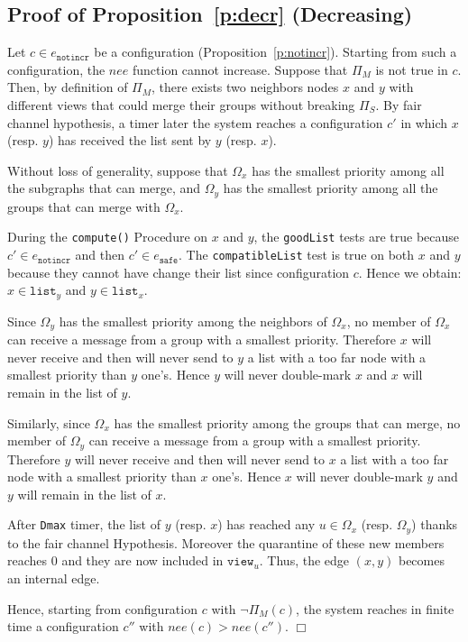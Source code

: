 \documentclass[11pt,english]{article}
\newenvironment{proof}[1][0cm]{
  \begin{list}{\bf Proof.~}{
      \setlength{\itemindent}{0cm}
      \setlength{\labelsep}{0cm}
      \setlength{\labelwidth}{#1}
      \setlength{\leftmargin}{#1}
    \item
    }
}{\hfill$\Box$
  \end{list}
}
\begin{document}
\subsection{Proof of Proposition~\ref{p:decr} (Decreasing)}

\begin{proof}
  Let $c \in e_\texttt{notincr}$ be a configuration
  (Proposition~\ref{p:notincr}). Starting from such a configuration, the $nee$
  function cannot increase.
Suppose that $\Pi_M$ is not true in $c$. Then, by definition of $\Pi_M$, there
  exists two neighbors nodes $x$ and $y$ with different views that could merge
  their groups without breaking $\Pi_S$. By fair channel hypothesis, a timer
  later the system reaches a configuration $c'$ in which $x$ (resp. $y$) has
  received the list sent by $y$ (resp. $x$).

  Without loss of generality, suppose that $\Omega_x$ has the smallest priority
  among all the subgraphs that can merge, and $\Omega_y$ has the smallest priority
  among all the groups that can merge with $\Omega_x$.

  During the \texttt{compute()} Procedure on $x$ and $y$, the \texttt{goodList}
  tests are true because $c' \in e_\texttt{notincr}$ and then $c' \in
  e_\texttt{safe}$. The \texttt{compatibleList} test is true on both $x$ and $y$
  because they cannot have change their list since configuration $c$. Hence we
  obtain: $x \in \texttt{list}_y$ and $y \in \texttt{list}_x$.

  Since $\Omega_y$ has the smallest priority among the neighbors of $\Omega_x$, no member
  of $\Omega_x$ can receive a message from a group with a smallest
  priority. Therefore $x$ will never receive and then will never send to $y$ a
  list with a too far node with a smallest priority than $y$ one's. Hence $y$
  will never double-mark $x$ and $x$ will remain in the list of $y$.

  Similarly, since $\Omega_x$ has the smallest priority among the groups that can
  merge, no member of $\Omega_y$ can receive a message from a group with a smallest
  priority. Therefore $y$ will never receive and then will never send to $x$ a
  list with a too far node with a smallest priority than $x$ one's. Hence $x$
  will never double-mark $y$ and $y$ will remain in the list of $x$.

  After \texttt{Dmax} timer, the list of $y$ (resp. $x$) has reached any $u \in
  \Omega_x$ (resp. $\Omega_y$) thanks to the fair channel Hypothesis. Moreover the
  quarantine of these new members reaches $0$ and they are now included in
  $\texttt{view}_u$. Thus, the edge $(x,y)$ becomes an internal edge.

  Hence, starting from configuration $c$ with $\neg\Pi_M(c)$, the system reaches
  in finite time a configuration $c''$ with $nee(c) > nee(c'')$.
\end{proof}
\end{document}
